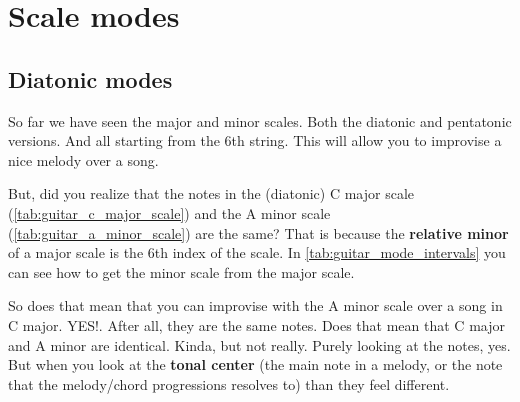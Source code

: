 \section{Scale modes}

\subsection{Diatonic modes}

So far we have seen the major and minor scales. Both the diatonic and pentatonic versions. And all starting from the 6th string. This will allow you to improvise a nice melody over a song.

But, did you realize that the notes in the (diatonic) C major scale (\autoref{tab:guitar_c_major_scale}) and the A minor scale (\autoref{tab:guitar_a_minor_scale}) are the same? That is because the \textbf{relative minor} of a major scale is the 6th index of the scale. In \autoref{tab:guitar_mode_intervals} you can see how to get the minor scale from the major scale.

So does that mean that you can improvise with the A minor scale over a song in C major. YES!. After all, they are the same notes. Does that mean that C major and A minor are identical. Kinda, but not really. Purely looking at the notes, yes. But when you look at the \textbf{tonal center} (the main note in a melody, or the note that the melody/chord progressions resolves to) than they feel different.

